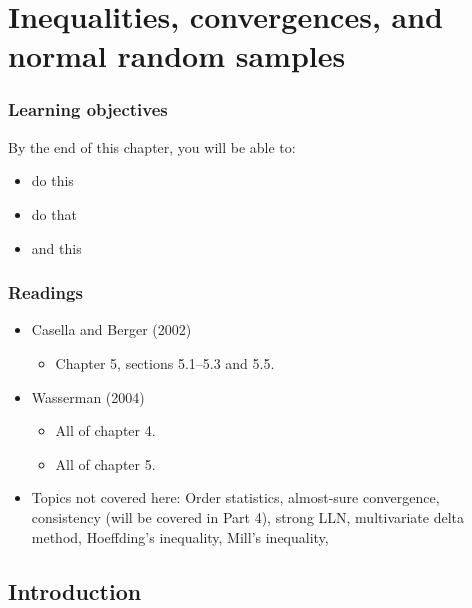\documentclass[
]{book}
\providecommand{\tightlist}{%
  \setlength{\itemsep}{0pt}\setlength{\parskip}{0pt}}
\theoremstyle{definition}
\theoremstyle{definition}
\theoremstyle{definition}
\theoremstyle{definition}
\theoremstyle{remark}
\begin{document}
\hypertarget{inequalities-convergences-and-normal-random-samples}{%
\chapter{Inequalities, convergences, and normal random samples}\label{inequalities-convergences-and-normal-random-samples}}

\hypertarget{learning-objectives-2}{%
\subsection*{Learning objectives}\label{learning-objectives-2}}

By the end of this chapter, you will be able to:

\begin{itemize}
\tightlist
\item
  do this
\item
  do that
\item
  and this
\end{itemize}

\hypertarget{readings-2}{%
\subsection*{Readings}\label{readings-2}}

\begin{itemize}
\tightlist
\item
  Casella and Berger (2002)

  \begin{itemize}
  \tightlist
  \item
    Chapter 5, sections 5.1--5.3 and 5.5.
  \end{itemize}
\item
  Wasserman (2004)

  \begin{itemize}
  \tightlist
  \item
    All of chapter 4.
  \item
    All of chapter 5.
  \end{itemize}
\item
  Topics not covered here: Order statistics, almost-sure convergence, consistency (will be covered in Part 4), strong LLN, multivariate delta method, Hoeffding's inequality, Mill's inequality,
\end{itemize}

\hypertarget{introduction-1}{%
\section{Introduction}\label{introduction-1}}
\end{document}
